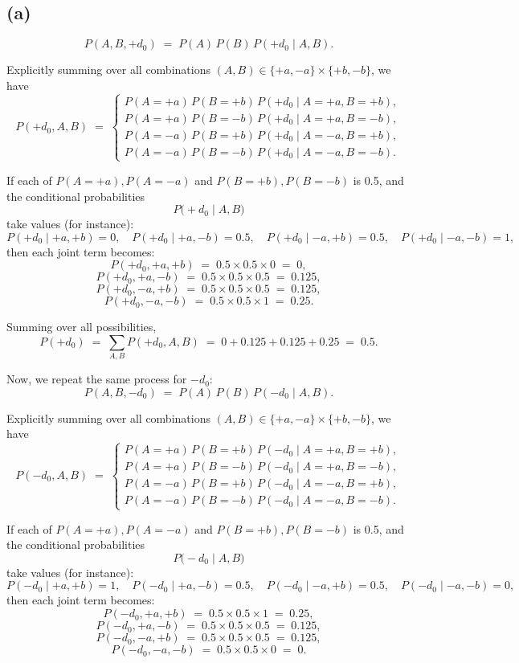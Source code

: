 \documentclass[11pt]{article}
\begin{document}
\subsection*{(a)}

\[
  P(A,B, +d_0) \;=\; P(A)\,P(B)\,P(+d_0 \mid A,B).
\]

Explicitly summing over all combinations \((A,B) \in \{+a, -a\}\times\{+b, -b\}\), we have
\[
  P(+d_0, A, B) \;=\;
  \begin{cases}
     P(A=+a)\,P(B=+b)\,P(+d_0 \mid A=+a, B=+b),\\[6pt]
     P(A=+a)\,P(B=-b)\,P(+d_0 \mid A=+a, B=-b),\\[6pt]
     P(A=-a)\,P(B=+b)\,P(+d_0 \mid A=-a, B=+b),\\[6pt]
     P(A=-a)\,P(B=-b)\,P(+d_0 \mid A=-a, B=-b).
  \end{cases}
\]

If each of \(P(A=+a), P(A=-a)\) and \(P(B=+b), P(B=-b)\) is 0.5, and the conditional probabilities
\[
  P\bigl(+d_0 \mid A, B\bigr)
\]
take values (for instance):
\[
  P(+d_0 \mid +a, +b) = 0, \quad
  P(+d_0 \mid +a, -b) = 0.5, \quad
  P(+d_0 \mid -a, +b) = 0.5, \quad
  P(+d_0 \mid -a, -b) = 1,
\]
then each joint term becomes:
\[
  P(+d_0, +a, +b) \;=\; 0.5 \times 0.5 \times 0 \;=\; 0,
\]
\[
  P(+d_0, +a, -b) \;=\; 0.5 \times 0.5 \times 0.5 \;=\; 0.125,
\]
\[
  P(+d_0, -a, +b) \;=\; 0.5 \times 0.5 \times 0.5 \;=\; 0.125,
\]
\[
  P(+d_0, -a, -b) \;=\; 0.5 \times 0.5 \times 1 \;=\; 0.25.
\]

Summing over all possibilities,
\[
  P(+d_0)
  \;=\;
  \sum_{A,B} P(+d_0, A, B)
  \;=\;
  0 + 0.125 + 0.125 + 0.25
  \;=\;
  0.5.
\]

\vspace{1em}

Now, we repeat the same process for $-d_0$:
\[
  P(A,B, -d_0) \;=\; P(A)\,P(B)\,P(-d_0 \mid A,B).
\]

Explicitly summing over all combinations \((A,B) \in \{+a, -a\}\times\{+b, -b\}\), we have
\[
  P(-d_0, A, B) \;=\;
  \begin{cases}
     P(A=+a)\,P(B=+b)\,P(-d_0 \mid A=+a, B=+b),\\[6pt]
     P(A=+a)\,P(B=-b)\,P(-d_0 \mid A=+a, B=-b),\\[6pt]
     P(A=-a)\,P(B=+b)\,P(-d_0 \mid A=-a, B=+b),\\[6pt]
     P(A=-a)\,P(B=-b)\,P(-d_0 \mid A=-a, B=-b).
  \end{cases}
\]

If each of \(P(A=+a), P(A=-a)\) and \(P(B=+b), P(B=-b)\) is 0.5, and the conditional probabilities
\[
  P\bigl(-d_0 \mid A, B\bigr)
\]
take values (for instance):
\[
  P(-d_0 \mid +a, +b) = 1, \quad
  P(-d_0 \mid +a, -b) = 0.5, \quad
  P(-d_0 \mid -a, +b) = 0.5, \quad
  P(-d_0 \mid -a, -b) = 0,
\]
then each joint term becomes:
\[
  P(-d_0, +a, +b) \;=\; 0.5 \times 0.5 \times 1 \;=\; 0.25,
\]
\[
  P(-d_0, +a, -b) \;=\; 0.5 \times 0.5 \times 0.5 \;=\; 0.125,
\]
\[
  P(-d_0, -a, +b) \;=\; 0.5 \times 0.5 \times 0.5 \;=\; 0.125,
\]
\[
  P(-d_0, -a, -b) \;=\; 0.5 \times 0.5 \times 0 \;=\; 0.
\]
\end{document}
